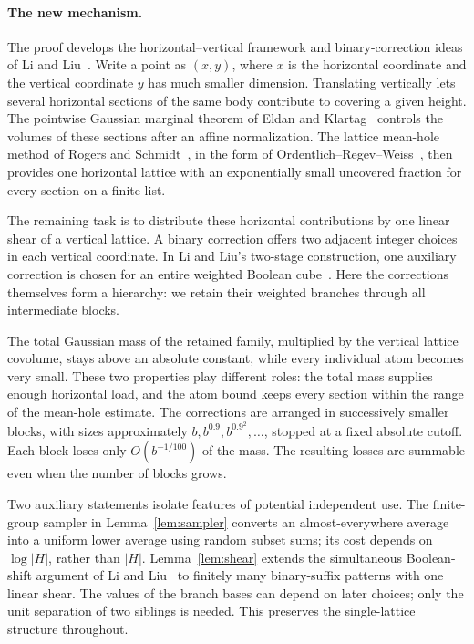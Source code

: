 \paragraph{The new mechanism.}
The proof develops the horizontal--vertical framework and binary-correction
ideas of Li and Liu~\cite{LL,LLC}. Write a point as $(x,y)$, where $x$
is the horizontal coordinate and the vertical coordinate $y$ has much
smaller dimension. Translating vertically lets several horizontal sections
of the same body contribute to covering a given height. The pointwise
Gaussian marginal theorem of Eldan and Klartag~\cite{EK} controls the
volumes of these sections after an affine normalization. The lattice
mean-hole method of Rogers and Schmidt~\cite{Rog58,Sch58}, in the
form of Ordentlich--Regev--Weiss~\cite[Theorem~2.3]{ORW}, then provides
one horizontal lattice with an exponentially small uncovered fraction for
every section on a finite list.

The remaining task is to distribute these horizontal contributions by one
linear shear of a vertical lattice. A binary correction offers two adjacent
integer choices in each vertical coordinate. In Li and Liu's two-stage
construction, one auxiliary correction is chosen for an entire weighted
Boolean cube~\cite[Theorem~6.2]{LLC}. Here the corrections themselves
form a hierarchy: we retain their weighted branches through all
intermediate blocks.

The total Gaussian mass of the retained family, multiplied by the
vertical lattice covolume, stays above an absolute constant,
while every individual atom becomes very small. These two properties
play different roles: the total mass supplies enough horizontal load,
and the atom bound keeps every section within the range of the mean-hole
estimate. The corrections are arranged in successively smaller blocks,
with sizes approximately $b,b^{0.9},b^{0.9^2},\ldots$, stopped at a
fixed absolute cutoff. Each block loses only $O(b^{-1/100})$ of the
mass. The resulting losses are summable even when the number of blocks
grows.

Two auxiliary statements isolate features of potential independent use.
The finite-group sampler in Lemma~\ref{lem:sampler} converts an
almost-everywhere average into a uniform lower average using random
subset sums; its cost depends on $\log|H|$, rather than $|H|$.
Lemma~\ref{lem:shear} extends the simultaneous Boolean-shift argument
of Li and Liu~\cite[Theorem~4.3]{LL} to finitely many binary-suffix
patterns with one linear shear. The values of the branch bases can depend
on later choices; only the unit separation of two siblings is needed.
This preserves the single-lattice structure throughout.

